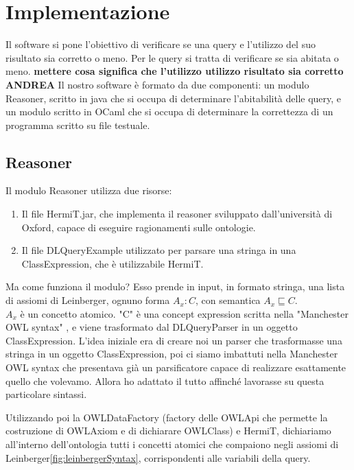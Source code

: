 \chapter[Implementazione]{Implementazione}
Il software si pone l'obiettivo di verificare se una query e l'utilizzo del suo risultato sia corretto o meno. Per le query si tratta di verificare se sia abitata o meno. \textbf{mettere cosa significa che l'utilizzo utilizzo risultato sia corretto ANDREA} Il nostro software è formato da due componenti: un modulo Reasoner, scritto in java che si occupa di determinare l'abitabilità delle query, e un modulo scritto in OCaml che si occupa di determinare la correttezza di un programma scritto su file testuale.

\section{Reasoner}
Il modulo Reasoner utilizza due risorse:
\begin{enumerate}
    \item Il file HermiT.jar\cite{HermiT}, che implementa il reasoner sviluppato dall'università di Oxford, capace di eseguire ragionamenti sulle ontologie.
    \item Il file DLQueryExample\cite{DLQueryExample} utilizzato per parsare una stringa in una ClassExpression, che è utilizzabile HermiT.
\end{enumerate}

Ma come funziona il modulo? Esso prende in input, in formato stringa, una lista di assiomi di Leinberger, ognuno forma \(A_{x} : C\), con semantica \( A_{x}\sqsubseteq C \).
\\\(A_{x}\) è un concetto atomico. "C" è una concept expression scritta nella "Manchester OWL syntax" \cite{ManchesterOWLSyntax}, e viene trasformato dal DLQueryParser in un oggetto ClassExpression. L'idea iniziale era di creare noi un parser che trasformasse una stringa in un oggetto ClassExpression, poi ci siamo imbattuti nella Manchester OWL syntax che presentava già un parsificatore capace di realizzare esattamente quello che volevamo. Allora ho adattato il tutto affinché lavorasse su questa particolare sintassi.

Utilizzando poi la OWLDataFactory (factory delle OWLApi che permette la costruzione di OWLAxiom e di dichiarare OWLClass) e HermiT\cite{HermiT}, dichiariamo all'interno dell'ontologia tutti i concetti atomici che compaiono negli assiomi di Leinberger\ref{fig:leinbergerSyntax}, corrispondenti alle variabili della query.

